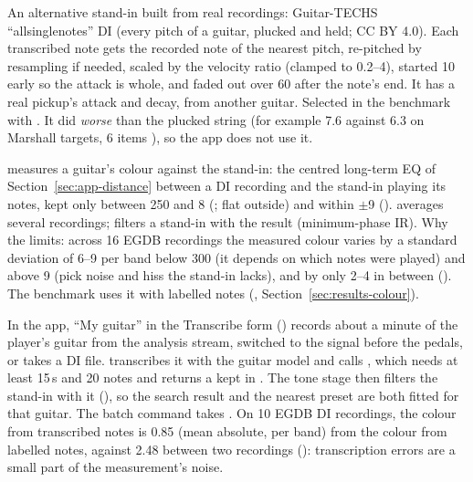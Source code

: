 \begin{inapp}
An alternative stand-in built from real recordings: Guitar-TECHS
``allsinglenotes'' DI (every pitch of a guitar, plucked and held; CC BY 4.0).
Each transcribed note gets the recorded note of the nearest pitch, re-pitched by
resampling if needed, scaled by the velocity ratio (clamped to 0.2--4), started
10\ms{} early so the attack is whole, and faded out over 60\ms{} after the note's
end. It has a real pickup's attack and decay, from another guitar. Selected in
the benchmark with . It did \emph{worse} than the
plucked string (for example 7.6 against 6.3\dB{} on Marshall targets, 6 items
\measured), so the app does not use it.
\end{inapp}

\begin{inapp}
\label{sec:impl-colour}
 measures a guitar's colour against the
stand-in: the centred long-term EQ of Section~\ref{sec:app-distance} between a DI
recording and the stand-in playing its notes, kept only between 250\Hz{} and
8\kHz{} (; flat outside) and within $\pm$9\dB{}
().  averages several recordings;
 filters a stand-in with the result (minimum-phase IR). Why the
limits: across 16 EGDB recordings the measured colour varies by a standard
deviation of 6--9\dB{} per band below 300\Hz{} (it depends on which notes were
played) and above 9\kHz{} (pick noise and hiss the stand-in lacks), and by only
2--4\dB{} in between \measured{} (). The benchmark uses
it with labelled notes (, Section~\ref{sec:results-colour}).

In the app, ``My guitar'' in the Transcribe form ()
records about a minute of the player's guitar from the analysis stream, switched
to the signal before the pedals, or takes a DI file.
 transcribes it with the guitar model and
calls , which needs at least 15\,s and 20 notes and returns a
 kept in . The tone stage
then filters the stand-in with it (), so the
search result and the nearest preset are both fitted for that guitar. The batch
command takes . On 10 EGDB DI recordings, the colour from
transcribed notes is 0.85\dB{} (mean absolute, per band) from the colour from
labelled notes, against 2.48\dB{} between two recordings \measured{}
(): transcription errors are a small
part of the measurement's noise.
\end{inapp}

